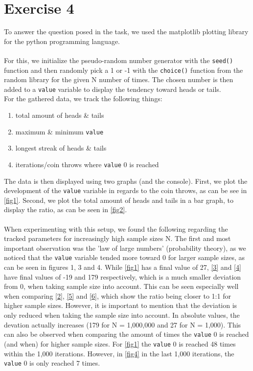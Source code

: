 \section{Exercise 4}

To answer the question posed in the task, we used the matplotlib plotting library for the python programming language.\\\\
For this, we initialize the pseudo-random number generator with the \texttt{seed()} function and then randomly pick a 1 or -1 with the \texttt{choice()} function from the random library for the given N number of times. The chosen number is then added to a \texttt{value} variable to display the tendency toward heads or tails.\\
For the gathered data, we track the following things:
\begin{enumerate}
    \item total amount of heads \& tails
    \item maximum \& minimum \texttt{value}
    \item longest streak of heads \& tails
    \item iterations/coin throws where \texttt{value} 0 is reached
\end{enumerate}
The data is then displayed using two graphs (and the console). First, we plot the development of the \texttt{value} variable in regards to the coin throws, as can be see in \autoref{fig1}. Second, we plot the total amount of heads and tails in a bar graph, to display the ratio, as can be seen in \autoref{fig2}.\\\\
When experimenting with this setup, we found the following regarding the tracked parameters for increasingly high sample sizes N. The first and most important observation was the 'law of large numbers' (probability theory), as we noticed that the \texttt{value} variable tended more toward 0 for larger sample sizes, as can be seen in figures 1, 3 and 4. While \autoref{fig1} has a final value of 27, \autoref{3} and \autoref{4} have final values of -19 and 179 respectively, which is a much smaller deviation from 0, when taking sample size into account. This can be seen especially well when comparing \autoref{2}, \autoref{5} and \autoref{6}, which show the ratio being closer to 1:1 for higher sample sizes. However, it is important to mention that the deviation is only reduced when taking the sample size into account. In absolute values, the devation actually increases (179 for N = 1,000,000 and 27 for N = 1,000). This can also be observed when comparing the amount of times the \texttt{value} 0 is reached (and when) for higher sample sizes. For \autoref{fig1} the \texttt{value} 0 is reached 48 times within the 1,000 iterations. However, in \autoref{fig4} in the last 1,000 iterations, the \texttt{value} 0 is only reached 7 times.\\\\
